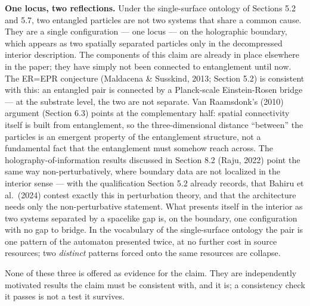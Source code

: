 \documentclass[
]{article}
\begin{document}
\textbf{One locus, two reflections.} Under the single-surface ontology
of Sections 5.2 and 5.7, two entangled particles are not two systems
that share a common cause. They are a single configuration --- one locus
--- on the holographic boundary, which appears as two spatially
separated particles only in the decompressed interior description. The
components of this claim are already in place elsewhere in the paper;
they have simply not been connected to entanglement until now. The
ER=EPR conjecture (Maldacena \& Susskind, 2013; Section 5.2) is
consistent with this: an entangled pair is connected by a Planck-scale
Einstein-Rosen bridge --- at the substrate level, the two are not
separate. Van Raamsdonk's (2010) argument (Section 6.3) points at the
complementary half: spatial connectivity itself is built from
entanglement, so the three-dimensional distance ``between'' the
particles is an emergent property of the entanglement structure, not a
fundamental fact that the entanglement must somehow reach across. The
holography-of-information results discussed in Section 8.2 (Raju, 2022)
point the same way non-perturbatively, where boundary data are not
localized in the interior sense --- with the qualification Section 5.2
already records, that Bahiru et al.~(2024) contest exactly this in
perturbation theory, and that the architecture needs only the
non-perturbative statement. What presents itself in the interior as two
systems separated by a spacelike gap is, on the boundary, one
configuration with no gap to bridge. In the vocabulary of the
single-surface ontology the pair is one pattern of the automaton
presented twice, at no further cost in source resources; two
\emph{distinct} patterns forced onto the same resources are collapse.

None of these three is offered as evidence for the claim. They are
independently motivated results the claim must be consistent with, and
it is; a consistency check it passes is not a test it survives.
\end{document}
